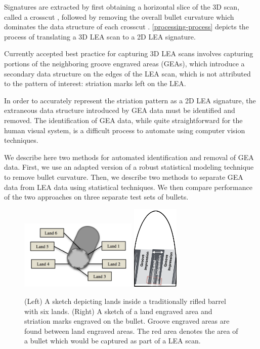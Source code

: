 \documentclass[12pt]{article}
\begin{document}
Signatures are extracted by first obtaining a horizontal slice of the 3D
scan, called a crosscut , followed by removing the overall
bullet curvature which dominates the data structure of each crosscut
. \autoref{processing-process} depicts the process of
translating a 3D LEA scan to a 2D LEA signature.

Currently accepted best practice for capturing 3D LEA scans involves
capturing portions of the neighboring groove engraved areas (GEAs),
which introduce a secondary data structure on the edges of the LEA scan,
which is not attributed to the pattern of interest: striation marks left
on the LEA.

In order to accurately represent the striation pattern as a 2D LEA
signature, the extraneous data structure introduced by GEA data must be
identified and removed. The identification of GEA data, while quite
straightforward for the human visual system, is a difficult process to
automate using computer vision techniques.

We describe here two methods for automated identification and removal of
GEA data. First, we use an adapted version of a robust statistical
modeling technique to remove bullet curvature. Then, we describe two
methods to separate GEA data from LEA data using statistical techniques.
We then compare performance of the two approaches on three separate test
sets of bullets.

\begin{figure}

\includegraphics[width=0.5\textwidth]{../images/scanning-stage0}
\hspace{3cm}
\includegraphics[width=0.2\textwidth]{../images/bullet-sketch}
\caption{(Left) A sketch depicting lands inside a traditionally rifled barrel with six lands. (Right) A sketch of a land engraved area and striation marks engraved on the bullet. Groove engraved areas are found between land engraved areas. The red area denotes the area of a bullet which would be captured as part of a LEA scan.}
\label{barrel-bullet}
\end{figure}
\end{document}
